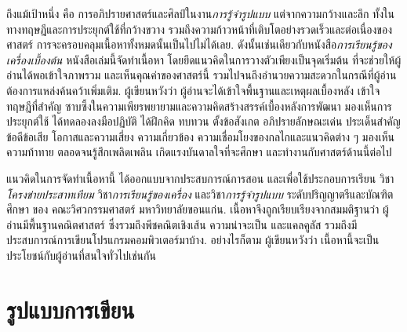 ถึงแม้เป้าหนึ่ง คือ
การอภิปรายศาสตร์และศิลป์ในงาน\textit{การรู้จำรูปแบบ}
แต่จากความกว้างและลึก ทั้งในทางทฤษฎีและการประยุกต์ใช้ที่กว้างขวาง
รวมถึงความก้าวหน้าที่เติบโตอย่างรวดเร็วและต่อเนื่องของศาสตร์
การจะครอบคลุมเนื้อหาทั้งหมดนั้นเป็นไปไม่ได้เลย.
ดังนั้นเช่นเดียวกับหนังสือ\textit\textit{การเรียนรู้ของเครื่องเบื้องต้น} หนังสือเล่มนี้จัดทำเนื้อหา โดยยึดแนวคิดในการวางตัวเพียงเป็นจุดเริ่มต้น
ที่จะช่วยให้ผู้อ่านได้พอเข้าใจภาพรวม และเห็นคุณค่าของศาสตร์นี้ 
รวมไปจนถึงอำนวยความสะดวกในกรณีที่ผู้อ่านต้องการแหล่งค้นคว้าเพิ่มเติม. 
ผู้เขียนหวังว่า ผู้อ่านจะได้เข้าใจพื้นฐานและเหตุผลเบื้องหลัง เข้าใจทฤษฎีที่สำคัญ 
ซาบซึ้งในความเพียรพยายามและความคิดสร้างสรรค์เบื้องหลังการพัฒนา
มองเห็นการประยุกต์ใช้ ได้ทดลองลงมือปฏิบัติ ได้ฝึกคิด ทบทวน ตั้งข้อสังเกต อภิปรายลักษณะเด่น ประเด็นสำคัญ ข้อดีข้อเสีย โอกาสและความเสี่ยง ความเกี่ยวข้อง ความเชื่อมโยงของกลไกและแนวคิดต่าง ๆ มองเห็นความท้าทาย ตลอดจนรู้สึกเพลิดเพลิน 
เกิดแรงบันดาลใจที่จะศึกษา และทำงานกับศาสตร์ด้านนี้ต่อไป

แนวคิดในการจัดทำเนื้อหานี้
ได้ออกแบบจากประสบการณ์การสอน
และเพื่อใช้ประกอบการเรียน 
วิชา\textit{โครงข่ายประสาทเทียม} 
วิชา\textit{การเรียนรู้ของเครื่อง}
และวิชา\textit{การรู้จำรูปแบบ} ระดับปริญญาตรีและบัณฑิตศึกษา ของ
คณะวิศวกรรมศาสตร์ มหาวิทยาลัยขอนแก่น.
เนื้อหาจึงถูกเรียบเรียงจากสมมติฐานว่า
ผู้อ่านมีพื้นฐานคณิตศาสตร์ ซึ่งรวมถึงพีชคณิตเชิงเส้น ความน่าจะเป็น และแคลคูลัส
รวมถึงมีประสบการณ์การเขียนโปรแกรมคอมพิวเตอร์มาบ้าง.
อย่างไรก็ตาม ผู้เขียนหวังว่า เนื้อหานี้จะเป็นประโยชน์กับผู้อ่านที่สนใจทั่วไปเช่นกัน
%
%
%
%
%
\vspace{-0.5cm}

\vfill
\pagebreak

\section*{รูปแบบการเขียน}



